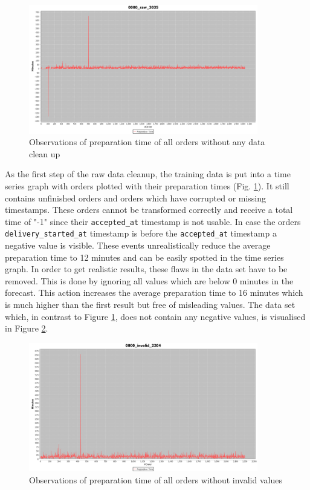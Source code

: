 \begin{figure}[h]
\begin{center}
\includegraphics[width=10cm]{images/0000_raw_3035.png}
\caption{Observations of preparation time of all orders without any data clean up}
\label{fig:0000_raw_3035}
\end{center}
\end{figure}

As the first step of the raw data cleanup, the training data is put into a time series graph with orders plotted with their preparation times (Fig. \ref{fig:0000_raw_3035}). It still contains unfinished orders and orders which have corrupted or missing timestamps. These orders cannot be transformed correctly and receive a total time of "-1" since their \texttt{accepted\_at} timestamp is not usable. In case the orders \texttt{delivery\_started\_at} timestamp is before the \texttt{accepted\_at} timestamp a negative value is visible. These events unrealistically reduce the average preparation time to 12 minutes and can be easily spotted in the time series graph. In order to get realistic results, these flaws in the data set have to be removed. This is done by ignoring all values which are below 0 minutes in the forecast. This action increases the average preparation time to 16 minutes which is much higher than the first result but free of misleading values. The data set which, in contrast to Figure \ref{fig:0000_raw_3035}, does not contain any negative values, is visualised in Figure \ref{fig:0000_invalid_2204}.

\begin{figure}[h]
\begin{center}
\includegraphics[width=10cm]{images/0000_invalid_2204.png}
\caption{Observations of preparation time of all orders without invalid values}
\label{fig:0000_invalid_2204}
\end{center}
\end{figure}

